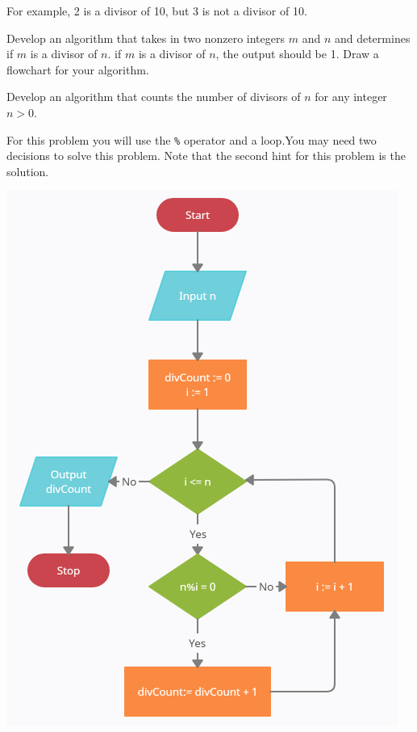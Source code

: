 \documentclass{ximera}
\begin{document}
For example, 2 is a divisor of 10, but 3 is not a divisor of 10.

\begin{question}
	Develop an algorithm that takes in two nonzero integers $m$ and $n$ and determines if $m$ is a divisor of $n$. if $m$ is a divisor of $n$, the output should be 1. Draw a flowchart for your algorithm.
	\begin{hint}
		
	\end{hint}
\end{question}

\begin{question}
        Develop an algorithm that counts the number of divisors of $n$ for any integer $n>0$. 
	\begin{hint}
	For this problem you will use the \verb|%| operator and a loop.You may need two decisions to solve this problem. Note that the second hint for this problem is the solution.
	\end{hint}

	\begin{hint}
	\begin{center}
		\includegraphics{divcount.png}
	\end{center}
	\end{hint}
\end{question}
\end{document}
